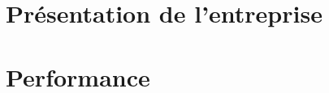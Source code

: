 \documentclass[asi]{picINSA}
\begin{document}
 \couverture{}
 \informationsGenerales{}
 \tableofcontents
 
\listoffigures
{}

\chapter{Présentation de l'entreprise}
	

\chapter{Performance}
	

%  	

 \pageQuatriemeCouverture{}	
\end{document}
